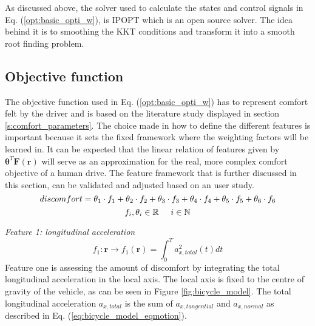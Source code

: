 As discussed above, the solver used to calculate the states and control signals in Eq. (\ref{opt:basic_opti_w}), is IPOPT which is an open source solver. The idea behind it is to smoothing the KKT conditions and transform it into a smooth root finding problem. \cite{Panos_opti} \\


\subsection{Objective function}\label{s:obj}
The objective function used in Eq. (\ref{opt:basic_opti_w}) has to represent comfort felt by the driver and is based on the literature study displayed in section \ref{s:comfort_parameters}. The choice made in how to define the different features is important because it sets the fixed framework where the weighting factors will be learned in.  It can be expected that the linear relation of features given by $\bm{\theta}^T\bm{F}(\bm{r})$ will serve as an approximation for the real, more complex comfort objective of a human drive. The feature framework that is further discussed in this section, can be validated and adjusted based on an user study.\\


\begin{equation}\label{eq:obj}
discomfort = \theta_1 \cdot f_1 +\theta_2 \cdot f_2 +\theta_3 \cdot f_3 +\theta_4 \cdot f_4 +\theta_5 \cdot f_5 +\theta_6 \cdot f_6 \\
\end{equation}
\[	f_i, \theta_i \in \mathbb{R} \hspace{5mm}
i \in \mathbb{N}\]


\textit{Feature 1: longitudinal acceleration}
\begin{equation}\label{eq:flong_acc}
f_{1}:\bm{r}\xrightarrow{}f_1(\bm{r})=\int_{0}^{T}a_{x,total}^{2}(t) dt
\end{equation}
Feature one is assessing the amount of discomfort by integrating the total longitudinal acceleration in the local axis. The local axis is fixed to the centre of gravity of the vehicle, as can be seen in Figure \ref{fig:bicycle_model}. The total longitudinal acceleration  $a_{x,total} $ is the sum of  $ a_{x,tangential}$ and $a_{x,normal}$ as described in Eq. (\ref{eq:bicycle_model_eqmotion}). \\

